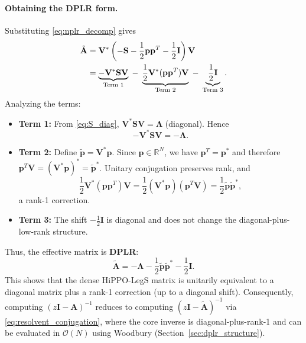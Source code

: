 \documentclass[a4paper,11pt]{article}
\begin{document}
\paragraph{Obtaining the DPLR form.}
Substituting \eqref{eq:nplr_decomp} gives
\begin{align}
    \tilde{\mathbf{A}}
    &= \mathbf{V}^*\left(-\mathbf{S}-\frac{1}{2}\mathbf{p}\mathbf{p}^T-\frac{1}{2}\mathbf{I}\right)\mathbf{V} \notag\\
    &= \underbrace{-\mathbf{V}^*\mathbf{S}\mathbf{V}}_{\text{Term 1}} \;-\;
       \underbrace{\frac{1}{2}\mathbf{V}^*(\mathbf{p}\mathbf{p}^T)\mathbf{V}}_{\text{Term 2}} \;-\;
       \underbrace{\frac{1}{2}\mathbf{I}}_{\text{Term 3}}.
\end{align}
Analyzing the terms:
\begin{itemize}
    \item \textbf{Term 1:} From \eqref{eq:S_diag}, $\mathbf{V}^*\mathbf{S}\mathbf{V}=\mathbf{\Lambda}$ (diagonal). Hence
    \[
    -\mathbf{V}^*\mathbf{S}\mathbf{V} = -\mathbf{\Lambda}.
    \]
    \item \textbf{Term 2:} Define $\tilde{\mathbf{p}}=\mathbf{V}^*\mathbf{p}$. Since $\mathbf{p}\in\mathbb{R}^N$, we have $\mathbf{p}^T=\mathbf{p}^*$ and therefore $\mathbf{p}^T\mathbf{V}=(\mathbf{V}^*\mathbf{p})^*=\tilde{\mathbf{p}}^*$. Unitary conjugation preserves rank, and
    \begin{equation}
        \frac{1}{2}\mathbf{V}^*(\mathbf{p}\mathbf{p}^T)\mathbf{V}
        = \frac{1}{2}(\mathbf{V}^*\mathbf{p})(\mathbf{p}^T\mathbf{V})
        = \frac{1}{2}\tilde{\mathbf{p}}\tilde{\mathbf{p}}^*,
    \end{equation}
    a rank-1 correction.
    \item \textbf{Term 3:} The shift $-\frac{1}{2}\mathbf{I}$ is diagonal and does not change the diagonal-plus-low-rank structure.
\end{itemize}
Thus, the effective matrix is \textbf{DPLR}:
\begin{equation}\label{eq:DPLR_Atilde}
    \tilde{\mathbf{A}} = -\mathbf{\Lambda} - \frac{1}{2}\tilde{\mathbf{p}}\tilde{\mathbf{p}}^* - \frac{1}{2}\mathbf{I}.
\end{equation}
This shows that the dense HiPPO-LegS matrix is unitarily equivalent to a diagonal matrix plus a rank-1 correction (up to a diagonal shift). Consequently, computing $(z\mathbf{I}-\mathbf{A})^{-1}$ reduces to computing $(z\mathbf{I}-\tilde{\mathbf{A}})^{-1}$ via \eqref{eq:resolvent_conjugation}, where the core inverse is diagonal-plus-rank-1 and can be evaluated in $\mathcal{O}(N)$ using Woodbury (Section~\ref{sec:dplr_structure}).
\end{document}
